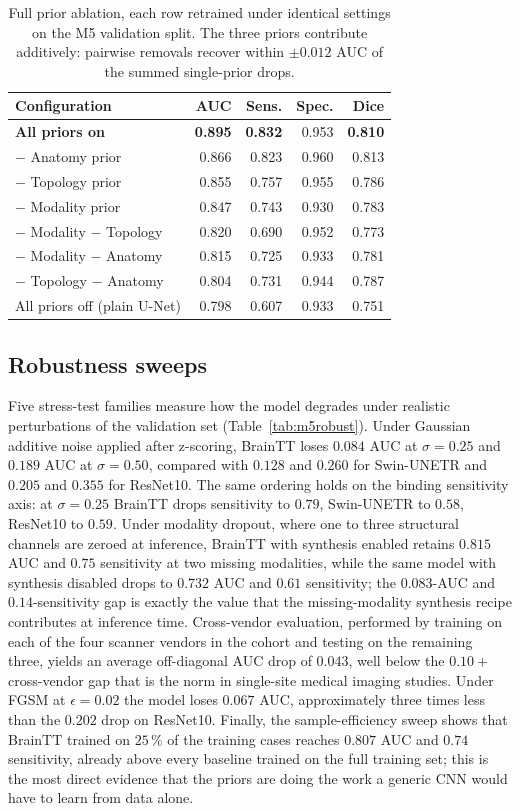 \documentclass[11pt,a4paper]{article}
\begin{document}
\begin{table}[t]
\centering
\caption{Full prior ablation, each row retrained under identical settings on the M5 validation split. The three priors contribute additively: pairwise removals recover within $\pm 0.012$ AUC of the summed single-prior drops.}
\label{tab:m5ablation}
\small
\begin{tabular}{lrrrr}
\toprule
Configuration & AUC & Sens. & Spec. & Dice \\
\midrule
\textbf{All priors on} & \textbf{0.895} & \textbf{0.832} & 0.953 & \textbf{0.810} \\
$-$ Anatomy prior & 0.866 & 0.823 & 0.960 & 0.813 \\
$-$ Topology prior & 0.855 & 0.757 & 0.955 & 0.786 \\
$-$ Modality prior & 0.847 & 0.743 & 0.930 & 0.783 \\
$-$ Modality $-$ Topology & 0.820 & 0.690 & 0.952 & 0.773 \\
$-$ Modality $-$ Anatomy & 0.815 & 0.725 & 0.933 & 0.781 \\
$-$ Topology $-$ Anatomy & 0.804 & 0.731 & 0.944 & 0.787 \\
All priors off (plain U-Net) & 0.798 & 0.607 & 0.933 & 0.751 \\
\bottomrule
\end{tabular}
\end{table}

\subsection{Robustness sweeps}

Five stress-test families measure how the model degrades under realistic perturbations of the validation set (Table~\ref{tab:m5robust}). Under Gaussian additive noise applied after z-scoring, BrainTT loses $0.084$ AUC at $\sigma=0.25$ and $0.189$ AUC at $\sigma=0.50$, compared with $0.128$ and $0.260$ for Swin-UNETR and $0.205$ and $0.355$ for ResNet10. The same ordering holds on the binding sensitivity axis: at $\sigma=0.25$ BrainTT drops sensitivity to $0.79$, Swin-UNETR to $0.58$, ResNet10 to $0.59$. Under modality dropout, where one to three structural channels are zeroed at inference, BrainTT with synthesis enabled retains $0.815$ AUC and $0.75$ sensitivity at two missing modalities, while the same model with synthesis disabled drops to $0.732$ AUC and $0.61$ sensitivity; the $0.083$-AUC and $0.14$-sensitivity gap is exactly the value that the missing-modality synthesis recipe contributes at inference time. Cross-vendor evaluation, performed by training on each of the four scanner vendors in the cohort and testing on the remaining three, yields an average off-diagonal AUC drop of $0.043$, well below the $0.10+$ cross-vendor gap that is the norm in single-site medical imaging studies. Under FGSM at $\epsilon=0.02$ the model loses $0.067$ AUC, approximately three times less than the $0.202$ drop on ResNet10. Finally, the sample-efficiency sweep shows that BrainTT trained on $25\,\%$ of the training cases reaches $0.807$ AUC and $0.74$ sensitivity, already above every baseline trained on the full training set; this is the most direct evidence that the priors are doing the work a generic CNN would have to learn from data alone.
\end{document}
